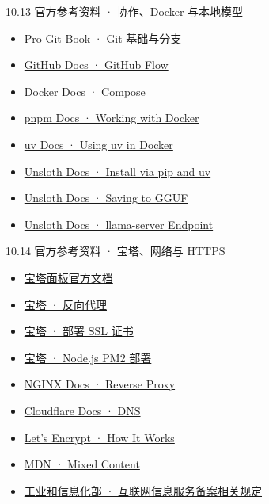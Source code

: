 \begin{frame}{10.13 官方参考资料 · 协作、Docker 与本地模型}
  \scriptsize
  \begin{itemize}
    \item \href{https://git-scm.com/book/en/v2}{Pro Git Book · Git 基础与分支}
    \item \href{https://docs.github.com/en/get-started/using-github/github-flow}{GitHub Docs · GitHub Flow}
    \item \href{https://docs.docker.com/compose/}{Docker Docs · Compose}
    \item \href{https://pnpm.io/docker}{pnpm Docs · Working with Docker}
    \item \href{https://docs.astral.sh/uv/guides/integration/docker/}{uv Docs · Using uv in Docker}
    \item \href{https://unsloth.ai/docs/get-started/install/pip-install}{Unsloth Docs · Install via pip and uv}
    \item \href{https://unsloth.ai/docs/basics/inference-and-deployment/saving-to-gguf}{Unsloth Docs · Saving to GGUF}
    \item \href{https://unsloth.ai/docs/basics/inference-and-deployment/llama-server-and-openai-endpoint}{Unsloth Docs · llama-server Endpoint}
  \end{itemize}
\end{frame}

\begin{frame}{10.14 官方参考资料 · 宝塔、网络与 HTTPS}
  \scriptsize
  \begin{itemize}
    \item \href{https://docs.bt.cn/}{宝塔面板官方文档}
    \item \href{https://docs.bt.cn/user-guide/site/php/site-config/reverse-proxy}{宝塔 · 反向代理}
    \item \href{https://docs.bt.cn/getting-started/deploy-ssl}{宝塔 · 部署 SSL 证书}
    \item \href{https://docs.bt.cn/practical-tutorials/nodejs-pm2-deployment}{宝塔 · Node.js PM2 部署}
    \item \href{https://docs.nginx.com/nginx/admin-guide/web-server/reverse-proxy/}{NGINX Docs · Reverse Proxy}
    \item \href{https://developers.cloudflare.com/dns/}{Cloudflare Docs · DNS}
    \item \href{https://letsencrypt.org/how-it-works/}{Let's Encrypt · How It Works}
    \item \href{https://developer.mozilla.org/en-US/docs/Web/Security/Defenses/Mixed_content}{MDN · Mixed Content}
    \item \href{https://www.miit.gov.cn/}{工业和信息化部 · 互联网信息服务备案相关规定}
  \end{itemize}
\end{frame}
